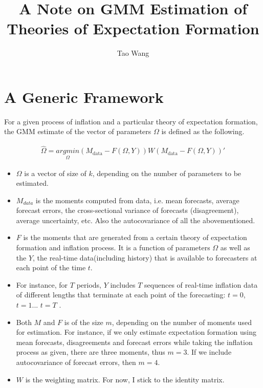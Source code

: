 \documentclass[]{article}
\title{A Note on GMM Estimation of Theories of Expectation Formation}
\author{Tao Wang}
\begin{document}
\maketitle

\section{A Generic Framework}

For a given process of inflation and a particular theory of expectation formation, the GMM estimate of the vector of parameters $\Omega$ is defined as the following. 

\begin{eqnarray}
\widehat \Omega = \underset{\Omega }{argmin} (M_{\textrm{data} } - F(\Omega, Y)) W  (M_{\textrm{data} } - F(\Omega, Y))'
\end{eqnarray}

\begin{itemize}
	\item  $\Omega$ is a vector of size of $k$, depending on the number of parameters to be estimated. 
	\item $M_{data}$ is the moments computed from data, i.e. mean forecasts, average forecast errors, the cross-sectional variance of forecasts (disagreement), average uncertainty, etc. Also the autocovariance of all the abovementioned.  
	
	\item $F$ is the moments that are generated from a certain theory of expectation formation and inflation process. It is a function of parameters $\Omega$ as well as the $Y$, the real-time data(including history) that is available to forecasters at each point of the time $t$. 
	\item For instance, for $T$ periods, $Y$ includes $T$  sequences of real-time inflation data of different lengths that terminate at each point of the forecasting:  $t =0$, $t=1$... $t=T$ . 
	\item  Both $M$ and $F$ is of the size  $m$, depending on the number of moments used for estimation. For instance, if we only estimate expectation formation using mean forecasts, disagreements and forecast errors while taking the inflation process as given, there are three moments, thus $m = 3$. If we include autocovariance of forecast errors, then $m=4$.  
	
	\item $W$ is the weighting matrix. For now, I stick to the identity matrix. 
\end{itemize}
\end{document}

